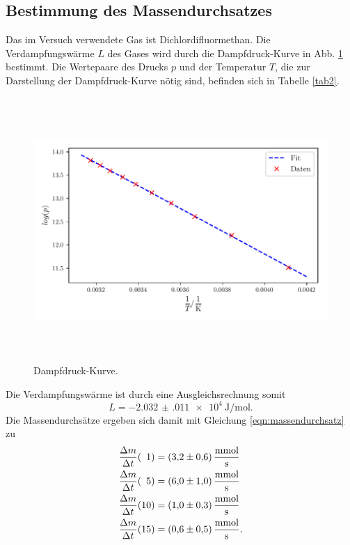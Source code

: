 \subsection{Bestimmung des Massendurchsatzes}
Das im Versuch verwendete Gas ist Dichlordifluormethan.
Die Verdampfungswärme $L$ des Gases wird durch die Dampfdruck-Kurve
in Abb. \ref{fig:plot2} bestimmt.
Die Wertepaare des Drucks $p$ und der Temperatur $T$, die zur
Darstellung der Dampfdruck-Kurve nötig sind, befinden sich in
Tabelle \ref{tab2}. 

\begin{figure}
    \centering
    \includegraphics[width=14cm, height=10cm]{build/plot2.pdf}
    \caption{Dampfdruck-Kurve.}
    \label{fig:plot2}
\end{figure}
\noindent Die Verdampfungswärme ist durch eine Ausgleichsrechnung somit
\begin{equation*}
    L = \SI{-2.032(011)e4}{\joule\per\mol}. %
\end{equation*}
Die Massendurchsätze ergeben sich damit mit Gleichung \eqref{eqn:massendurchsatz} zu %
\begin{align*}
    \frac{\Delta m}{\Delta t}(\phantom{1}1) &= \SI{3.2 \pm 0.6}{\milli\mol\per\second} \\
    \frac{\Delta m}{\Delta t}(\phantom{1}5) &= \SI{6.0 \pm 1.0}{\milli\mol\per\second} \\
    \frac{\Delta m}{\Delta t}(10) &= \SI{1.0 \pm 0.3}{\milli\mol\per\second} \\
    \frac{\Delta m}{\Delta t}(15) &= \SI{0.6 \pm 0.5}{\milli\mol\per\second}. %
\end{align*}

